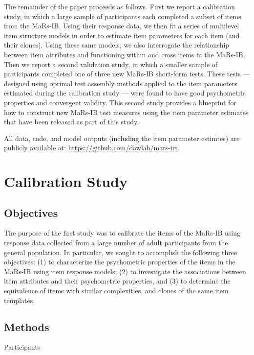 \documentclass[a4paper,man,natbib]{apa6}
\makeatletter
\renewcommand{\subsubsection}{\@startsection{subsubsection}{3}
  {\z@}%
  {\b@level@two@skip}{\e@level@two@skip}%
  {\normalfont\normalsize\bfseries}}
\makeatother
\begin{document}
The remainder of the paper proceeds as follows. First we report a calibration study, in which a large sample of participants each completed a subset of items from the MaRs-IB. Using their response data, we then fit a series of multilevel item structure models in order to estimate item parameters for each item (and their clones). Using these same models, we also interrogate the relationship between item attributes and functioning within and cross items in the MaRs-IB. Then we report a second validation study, in which a smaller sample of participants completed one of three new MaRs-IB short-form tests. These tests --- designed using optimal test assembly methods applied to the item parameters estimated during the calibration study --- were found to have good psychometric properties and convergent validity. This second study provides a blueprint for how to construct new MaRs-IB test measures using the item parameter estimates that have been released as part of this study.

All data, code, and model outputs (including the item parameter estimtes) are publicly available at: \url{https://github.com/dawlab/mars-irt}.

\clearpage
\section{Calibration Study}

\subsection{Objectives}

The purpose of the first study was to calibrate the items of the MaRs-IB using response data collected from a large number of adult participants from the general population. In particular, we sought to accomplish the following three objectives: (1) to characterize the psychometric properties of the items in the MaRs-IB using item response models; (2) to investigate the associations between item attributes and their psychometric properties, and (3) to determine the equivalence of items with similar complexities, and clones of the same item templates. 

\subsection{Methods}

\subsubsection{Participants} 
\end{document}
